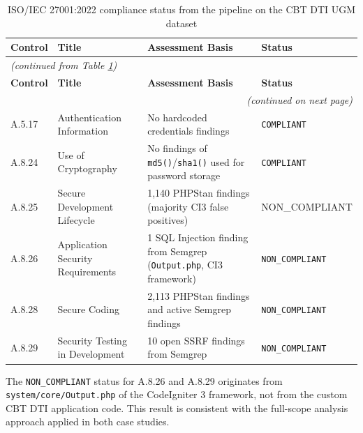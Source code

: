 \newpage
\begin{longtable}{|l|>{\raggedright\arraybackslash}p{2.5cm}|p{6cm}|p{3cm}|}
\caption{ISO/IEC 27001:2022 compliance status from the pipeline on the CBT DTI UGM dataset}
\label{tab:iso-status-dti} \\
\hline
\textbf{Control} & \textbf{Title} & \textbf{Assessment Basis} & \textbf{Status} \\
\hline \hline
\endfirsthead

\multicolumn{4}{l}{\textit{(continued from Table \ref{tab:iso-status-dti})}} \\
\hline
\textbf{Control} & \textbf{Title} & \textbf{Assessment Basis} & \textbf{Status} \\
\hline \hline
\endhead

\hline
\multicolumn{4}{r}{\textit{(continued on next page)}} \\
\endfoot

\hline
\endlastfoot

A.5.17 & Authentication Information &
No hardcoded credentials findings &
\texttt{COMPLIANT} \\
\hline

A.8.24 & Use of Cryptography &
No findings of \texttt{md5()}/\texttt{sha1()} used for password storage &
\texttt{COMPLIANT} \\
\hline

A.8.25 & Secure Development Lifecycle &
1,140 PHPStan findings (majority CI3 false positives) &
{\footnotesize\ttfamily NON\_COMPLIANT} \\
\hline

A.8.26 & Application Security Requirements &
1 SQL Injection finding from Semgrep (\texttt{Output.php}, CI3 framework) &
{\footnotesize \texttt{NON\_COMPLIANT}} \\
\hline

A.8.28 & Secure Coding &
2,113 PHPStan findings and active Semgrep findings &
{\footnotesize \texttt{NON\_COMPLIANT}} \\
\hline

A.8.29 & Security Testing in Development &
10 open SSRF findings from Semgrep &
{\footnotesize \texttt{NON\_COMPLIANT}} \\
\end{longtable}

The \texttt{NON\_COMPLIANT} status for A.8.26 and A.8.29 originates from \texttt{system/core/\allowbreak Output.php} of the CodeIgniter 3 framework, not from the custom CBT DTI application code. This result is consistent with the full-scope analysis approach applied in both case studies.

